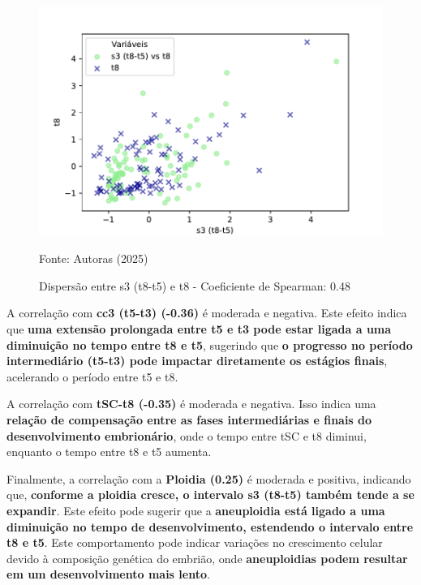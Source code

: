 \begin{figure}[h]
    \captionsetup{font=footnotesize, justification=centering, labelsep=period, position=above}
    \caption{Dispersão entre s3 (t8-t5) e t8 - Coeficiente de Spearman: 0.48}
    \label{fig:s3-t8}
    \centering
    \includegraphics[scale=0.5]{figuras/Spearman/s3-t8.pdf}
    \vspace{0.3cm} 
    \begin{minipage}{\linewidth}
        \centering
        \scriptsize{Fonte: Autoras (2025)}
    \end{minipage}
\end{figure}
\FloatBarrier

A correlação com \textbf{cc3 (t5-t3) (-0.36)} é moderada e negativa. Este efeito indica que \textbf{uma extensão prolongada entre t5 e t3 pode estar ligada a uma diminuição no tempo entre t8 e t5}, sugerindo que \textbf{o progresso no período intermediário (t5-t3) pode impactar diretamente os estágios finais}, acelerando o período entre t5 e t8.

A correlação com \textbf{tSC-t8 (-0.35)} é moderada e negativa. Isso indica uma \textbf{relação de compensação entre as fases intermediárias e finais do desenvolvimento embrionário}, onde o tempo entre tSC e t8 diminui, enquanto o tempo entre t8 e t5 aumenta.

Finalmente, a correlação com a \textbf{Ploidia (0.25)} é moderada e positiva, indicando que, \textbf{conforme a ploidia cresce, o intervalo s3 (t8-t5) também tende a se expandir}. Este efeito pode sugerir que a \textbf{aneuploidia está ligado a uma diminuição no tempo de desenvolvimento, estendendo o intervalo entre t8 e t5}. Este comportamento pode indicar variações no crescimento celular devido à composição genética do embrião, onde \textbf{aneuploidias podem resultar em um desenvolvimento mais lento}.

